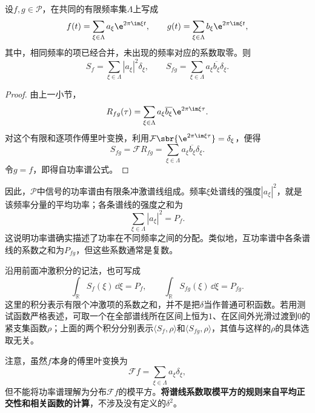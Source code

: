 \begin{theorem}[有限频率信号的功率谱]\label{thm:PSD}
    设$f,g\in\mathcal{P}$，在共同的有限频率集$\Lambda$上写成
    \begin{equation}
        f(t)=\sum_{\xi\in\Lambda}a_\xi\e^{2\pi\im\xi t},\qquad g(t)=\sum_{\xi\in\Lambda}b_\xi\e^{2\pi\im\xi t},
    \end{equation}
    其中，相同频率的项已经合并，未出现的频率对应的系数取零。则
    \begin{equation}
        S_f=\sum_{\xi\in\Lambda}|a_\xi|^2\delta_\xi,\qquad S_{fg}=\sum_{\xi\in\Lambda}a_\xi\overline{b_\xi}\delta_\xi.
    \end{equation}
\end{theorem}
\begin{proof}
    由上一小节，
    \begin{equation}
        R_{fg}(\tau)=\sum_{\xi\in\Lambda}a_\xi\overline{b_\xi}\e^{2\pi\im\xi\tau}.
    \end{equation}
    对这个有限和逐项作傅里叶变换，利用$\mathcal{F}\sbr{\e^{2\pi\im\xi\tau}}=\delta_\xi$，便得
    \begin{equation}
        S_{fg}=\mathcal{F}R_{fg}=\sum_{\xi\in\Lambda}a_\xi\overline{b_\xi}\delta_\xi.
    \end{equation}
    令$g=f$，即得自功率谱公式。
\end{proof}

因此，$\mathcal{P}$中信号的功率谱由有限条冲激谱线组成。频率$\xi$处谱线的强度$|a_\xi|^2$，就是该频率分量的平均功率；各条谱线的强度之和为
\begin{equation}
    \sum_{\xi\in\Lambda}|a_\xi|^2=P_f.
\end{equation}
这说明功率谱确实描述了功率在不同频率之间的分配。类似地，互功率谱中各条谱线的系数之和为$P_{fg}$，但这些系数通常是复数。

沿用前面冲激积分的记法，也可写成
\begin{equation}
    \int_{\mathbb{R}}S_f(\xi)\,\dd\xi=P_f,\qquad \int_{\mathbb{R}}S_{fg}(\xi)\,\dd\xi=P_{fg}.
\end{equation}
这里的积分表示有限个冲激项的系数之和，并不是把$\delta$当作普通可积函数。若用测试函数严格表述，可取一个在全部谱线所在区间上恒为$1$、在区间外光滑过渡到$0$的紧支集函数$\rho$；上面的两个积分分别表示$\langle S_f,\rho\rangle$和$\langle S_{fg},\rho\rangle$，其值与这样的$\rho$的具体选取无关。

注意，虽然$f$本身的傅里叶变换为
\begin{equation}
    \mathcal{F}f=\sum_{\xi\in\Lambda}a_\xi\delta_\xi,
\end{equation}
但不能将功率谱理解为分布$\mathcal{F}f$的模平方。\textbf{将谱线系数取模平方的规则来自平均正交性和相关函数的计算}，不涉及没有定义的$\delta^2$。

